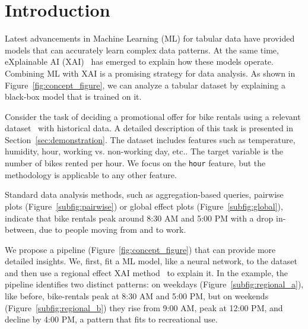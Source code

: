 \documentclass[
twocolumn,
]{ceurart}
\begin{document}
\maketitle


\section{Introduction}
\label{sec:introduction}

Latest advancements in Machine Learning (ML) for tabular data have provided models that can accurately learn complex data patterns.
At the same time, eXplainable AI (XAI)~\cite{freiesleben2022scientific, ribeiro2016should} has emerged to explain how these models operate.
Combining ML with XAI is a promising strategy for data analysis. As shown in Figure~\ref{fig:concept_figure}, we can analyze a tabular dataset by explaining a black-box model that is trained on it.

Consider the task of deciding a promotional offer for bike rentals using a relevant dataset~\cite{fanaee2014event} with historical data. A detailed description of this task is presented in Section~\ref{sec:demonstration}. The dataset includes features such as temperature, humidity, hour, working vs. non-working day, etc.. The target variable is the number of bikes rented per hour. We focus on the \texttt{hour} feature, but the methodology is applicable to any other feature.

Standard data analysis methods, such as aggregation-based queries, pairwise plots (Figure~\ref{subfig:pairwise}) or global effect plots (Figure~\ref{subfig:global}), indicate that bike rentals peak around 8:30 AM and 5:00 PM with a drop in-between, due to people moving from and to work.

We propose a pipeline (Figure~\ref{fig:concept_figure}) that can provide more detailed insights. We, first, fit a ML model, like a neural network, to the dataset and then use a regional effect XAI method~\cite{herbinger2023decomposing, herbinger_repid_2022, britton2019vine, scholbeck2024marginal, hu2020surrogate} to explain it.
In the example, the pipeline identifies two distinct patterns: on weekdays (Figure~\ref{subfig:regional_a}), like before, bike-rentals peak at 8:30 AM and 5:00 PM, but on weekends (Figure~\ref{subfig:regional_b}) they rise from 9:00 AM, peak at 12:00 PM, and decline by 4:00 PM, a pattern that fits to recreational use.
\end{document}
